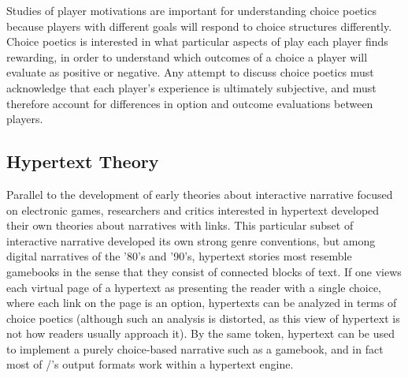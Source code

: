 Studies of player motivations are important for understanding choice poetics because players with different goals will respond to choice structures differently.
%
Choice poetics is interested in what particular aspects of play each player finds rewarding, in order to understand which outcomes of a choice a player will evaluate as positive or negative.
%
Any attempt to discuss choice poetics must acknowledge that each player's experience is ultimately subjective, and must therefore account for differences in option and outcome evaluations between players.





\subsection{Hypertext Theory}

Parallel to the development of early theories about interactive narrative focused on electronic games, researchers and critics interested in hypertext developed their own theories about narratives with links.
%
This particular subset of interactive narrative developed its own strong genre conventions, but among digital narratives of the '80's and '90's, hypertext stories most resemble gamebooks in the sense that they consist of connected blocks of text.
%
If one views each virtual page of a hypertext as presenting the reader with a single choice, where each link on the page is an option, hypertexts can be analyzed in terms of choice poetics (although such an analysis is distorted, as this view of hypertext is not how readers usually approach it).
%
By the same token, hypertext can be used to implement a purely choice-based narrative such as a gamebook, and in fact most of \dunyazad/'s output formats work within a hypertext engine.


